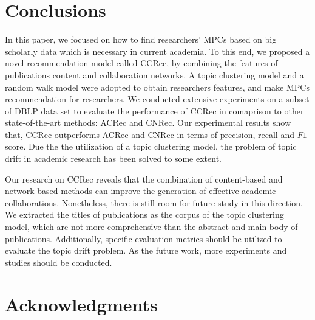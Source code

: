 \section*{Conclusions}
In this paper, we focused on how to find researchers' MPCs based on big scholarly data which is necessary in current academia. To this end, we proposed a novel recommendation model called CCRec, by combining the features of publications content and collaboration networks. A topic clustering model and a random walk model were adopted to obtain researchers features, and make MPCs recommendation for researchers. We conducted extensive experiments on a subset of DBLP data set to evaluate the performance of CCRec in comaprison to other state-of-the-art methods: ACRec and CNRec. Our experimental results show that, CCRec outperforms ACRec and CNRec in terms of precision, recall and $F1$ score. Due the the utilization of a topic clustering model, the problem of topic drift in academic research has been solved to some extent.

Our research on CCRec reveals that the combination of content-based and network-based methods can improve the generation of effective academic collaborations. Nonetheless, there is still room for future study in this direction. We extracted the titles of publications as the corpus of the topic clustering model, which are not more comprehensive than the abstract and main body of publications. Additionally, specific evaluation metrics should be utilized to evaluate the topic drift problem. As the future work, more experiments and studies should be conducted.


\section*{Acknowledgments}



%
%
%


